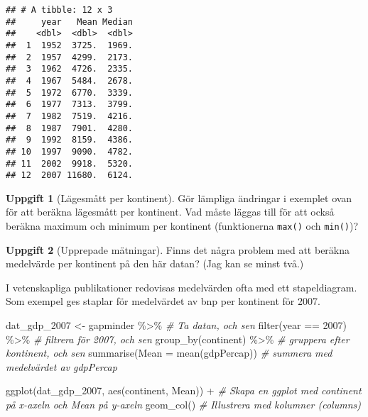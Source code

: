 \documentclass[
]{book}
\newenvironment{Shaded}{\begin{snugshade}}{\end{snugshade}}
\newcommand{\AttributeTok}[1]{\textcolor[rgb]{0.77,0.63,0.00}{#1}}
\newcommand{\CommentTok}[1]{\textcolor[rgb]{0.56,0.35,0.01}{\textit{#1}}}
\newcommand{\DecValTok}[1]{\textcolor[rgb]{0.00,0.00,0.81}{#1}}
\newcommand{\FunctionTok}[1]{\textcolor[rgb]{0.00,0.00,0.00}{#1}}
\newcommand{\NormalTok}[1]{#1}
\newcommand{\OtherTok}[1]{\textcolor[rgb]{0.56,0.35,0.01}{#1}}
\newcommand{\SpecialCharTok}[1]{\textcolor[rgb]{0.00,0.00,0.00}{#1}}
\theoremstyle{definition}
\theoremstyle{definition}
\theoremstyle{definition}
\newtheorem{exercise}{Uppgift}[chapter]
\theoremstyle{definition}
\theoremstyle{remark}
\begin{document}
\begin{verbatim}
## # A tibble: 12 x 3
##     year   Mean Median
##    <dbl>  <dbl>  <dbl>
##  1  1952  3725.  1969.
##  2  1957  4299.  2173.
##  3  1962  4726.  2335.
##  4  1967  5484.  2678.
##  5  1972  6770.  3339.
##  6  1977  7313.  3799.
##  7  1982  7519.  4216.
##  8  1987  7901.  4280.
##  9  1992  8159.  4386.
## 10  1997  9090.  4782.
## 11  2002  9918.  5320.
## 12  2007 11680.  6124.
\end{verbatim}

\begin{exercise}[Lägesmått per kontinent]
Gör lämpliga ändringar i exemplet ovan för att beräkna lägesmått per kontinent. Vad måste läggas till för att också beräkna maximum och minimum per kontinent (funktionerna \texttt{max()} och \texttt{min()})?
\end{exercise}

\begin{exercise}[Upprepade mätningar]
Finns det några problem med att beräkna medelvärde per kontinent på den här datan? (Jag kan se minst två.)
\end{exercise}

I vetenskapliga publikationer redovisas medelvärden ofta med ett stapeldiagram. Som exempel ges staplar för medelvärdet av bnp per kontinent för 2007.

\begin{Shaded}
\begin{Highlighting}[]
\NormalTok{dat\_gdp\_2007 }\OtherTok{\textless{}{-}}\NormalTok{ gapminder }\SpecialCharTok{\%\textgreater{}\%}                    \CommentTok{\# Ta datan, och sen}
  \FunctionTok{filter}\NormalTok{(year }\SpecialCharTok{==} \DecValTok{2007}\NormalTok{) }\SpecialCharTok{\%\textgreater{}\%}                       \CommentTok{\# filtrera för 2007, och sen}
  \FunctionTok{group\_by}\NormalTok{(continent) }\SpecialCharTok{\%\textgreater{}\%}                        \CommentTok{\# gruppera efter kontinent, och sen}
  \FunctionTok{summarise}\NormalTok{(}\AttributeTok{Mean =} \FunctionTok{mean}\NormalTok{(gdpPercap))              }\CommentTok{\# summera med medelvärdet av gdpPercap}

\FunctionTok{ggplot}\NormalTok{(dat\_gdp\_2007, }\FunctionTok{aes}\NormalTok{(continent, Mean)) }\SpecialCharTok{+}     \CommentTok{\# Skapa en ggplot med continent på x{-}axeln och Mean på y{-}axeln}
  \FunctionTok{geom\_col}\NormalTok{()                                     }\CommentTok{\# Illustrera med kolumner (columns)}
\end{Highlighting}
\end{Shaded}
\end{document}
